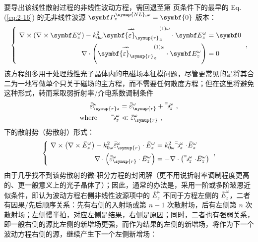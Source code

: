 要导出该线性散射过程的非线性波动方程，需回退至第 \pageref{con:1} 页条件下的最早的 Eq.(\ref{eq:2-16}) 的无非线性波源 $\symbf P^{{\symup{NL}},\omega}_z = \symbf{0}$ 版本：
\begin{equation} \label{eq:2-228}
	\left\{\ \begin{aligned} \nabla \times \left( \nabla \times \symbf E^{\omega}_z \right) - k^{2}_{0\omega} \overset{\rightharpoonup\!\!\!\! \rightharpoonup}{\symbf{\varepsilon}_{\symup{r}}}^{(1)\omega}_{z} \cdot \symbf E^{\omega}_z &= \symbf 0 \\ \nabla \cdot \left( \overset{\rightharpoonup\!\!\!\! \rightharpoonup}{\symbf{\varepsilon}_{\symup{r}}}^{(1)\omega}_{z} \cdot \symbf E^{\omega}_z \right) &= 0 \end{aligned}\right. ~,
\end{equation}
该方程组多用于处理线性光子晶体内的电磁场本征模问题，尽管更常见的是将其合二为一地写做单个只关于磁场的主方程，而不需要任何散度方程\cite{sakodaOpticalPropertiesPhotonic2005,joannopoulosPhotonicCrystalsMolding2008}；但在这里将避免这种形式，转而采取弱折射率/介电系数调制条件
\begin{subequations} \label{eq:2-229}
	\abovedisplayskip=13pt
	\belowdisplayskip=13pt
	\begin{align}
		\bar{\bar{\varepsilon}}^{\omega}_{\symup{r}z} &= \bar{\bar{\varepsilon}}^{\omega}_{\symup{r}} + \bar{\bar{\backepsilon}}^{\omega}_{z} \label{eq:2-229a}~, \\ \text{where}\ \ \ \ \ \ \bar{\bar{\backepsilon}}^{\omega}_{z} &\ll \bar{\bar{\varepsilon}}^{\omega}_{\symup{r}} \label{eq:2-229b}~,
	\end{align}
\end{subequations}
下的散射势（势散射）形式\cite{bornPrinciplesOptics60th2019,gerkeAperiodicVolumeOptics2010}：
\begin{equation} \label{eq:2-230}
	\left\{\ \begin{aligned} \nabla \times \left( \nabla \times \bar{E}^{\omega}_z \right) - k^{2}_{0\omega} \bar{\bar{\varepsilon}}^{\omega}_{\symup{r}} \cdot \bar{E}^{\omega}_z &= k^{2}_{0\omega} \bar{\bar{\backepsilon}}^{\omega}_{z} \cdot \bar{E}^{\omega}_z \\ \nabla \cdot \left( \bar{\bar{\varepsilon}}^{\omega}_{\symup{r}} \cdot \bar{E}^{\omega}_z \right) &= - \nabla \cdot \left( \bar{\bar{\backepsilon}}^{\omega}_{z} \cdot \bar{E}^{\omega}_z \right) \end{aligned}\right. ~,
\end{equation}
由于几乎找不到该势散射的微-积分方程的封闭解（更不用说折射率调制程度更高的、更一般意义上的光子晶体了）；因此，通常的办法是，采用一阶或多阶玻恩近似\cite{bornPrinciplesOptics60th2019}条件，即认为波动方程右侧非线性波源项中的 $\bar{E}^{\omega}_z$ 不同于方程左侧的 $\bar{E}^{\omega}_z$，二者有因果/先后顺序关系：先有右侧的入射场或第 $n-1$ 次散射场，后有左侧第 $n$ 次散射场；左侧慢半拍，对应左侧是结果，右侧是原因；同时，二者也有强弱关系，即一般右侧的源比左侧的新增场更强，而作为结果的左侧的新增场，将作为下一个波动方程右侧的源，继续产生下一个左侧新增场：
